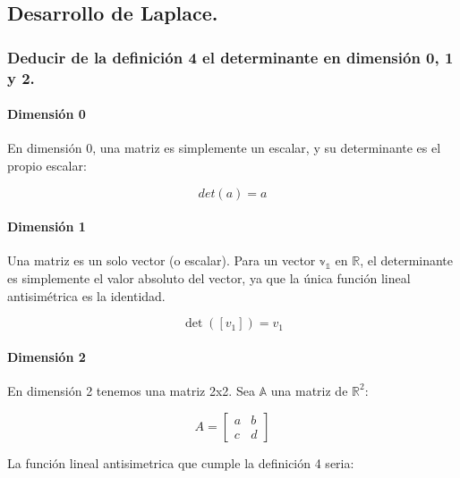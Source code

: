 \documentclass[11pt]{article}
\begin{document}
\subsection{Desarrollo de Laplace.}\label{desarrollo-de-laplace.}

\subsubsection{Deducir de la definición 4 el determinante en dimensión
0, 1 y
2.}\label{deducir-de-la-definiciuxf3n-4-el-determinante-en-dimensiuxf3n-0-1-y-2.}

    \paragraph{Dimensión 0}\label{dimensiuxf3n-0}

En dimensión 0, una matriz es simplemente un escalar, y su determinante
es el propio escalar:

\begin{equation}
det(a) = a
\end{equation}

\paragraph{Dimensión 1}\label{dimensiuxf3n-1}

Una matriz es un solo vector (o escalar). Para un vector
\(\mathbb{v_1}\) en \(\mathbb{R}\), el determinante es simplemente el
valor absoluto del vector, ya que la única función lineal antisimétrica
es la identidad.

\begin{equation}
\det([v_1]) = v_1
\end{equation}

\paragraph{Dimensión 2}\label{dimensiuxf3n-2}

En dimensión 2 tenemos una matriz 2x2. Sea \(\mathbb{A}\) una matriz de
\(\mathbb{R}^2\):

\begin{equation}
A =
\begin{bmatrix}
a & b \\
c & d
\end{bmatrix}
\end{equation}

La función lineal antisimetrica que cumple la definición 4 seria:
\end{document}
